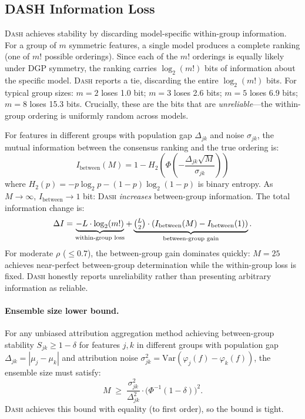 \documentclass{jmlr}
\newcommand{\Var}{\mathrm{Var}}
\newcommand{\DASH}{\textsc{Dash}}
\begin{document}
\subsection{DASH Information Loss}
\label{sec:info-loss}

\DASH{} achieves stability by discarding model-specific within-group information. For a group of $m$ symmetric features, a single model produces a complete ranking (one of $m!$ possible orderings). Since each of the $m!$ orderings is equally likely under DGP symmetry, the ranking carries $\log_2(m!)$ bits of information about the specific model. \DASH{} reports a tie, discarding the entire $\log_2(m!)$ bits. For typical group sizes: $m=2$ loses 1.0 bit; $m=3$ loses 2.6 bits; $m=5$ loses 6.9 bits; $m=8$ loses 15.3 bits. Crucially, these are the bits that are \emph{unreliable}---the within-group ordering is uniformly random across models.

For features in different groups with population gap $\Delta_{jk}$ and noise $\sigma_{jk}$, the mutual information between the consensus ranking and the true ordering is:
\[
    I_{\text{between}}(M) = 1 - H_2\!\left(\Phi\!\left(-\frac{\Delta_{jk}\sqrt{M}}{\sigma_{jk}}\right)\right)
\]
where $H_2(p) = -p\log_2 p - (1-p)\log_2(1-p)$ is binary entropy. As $M \to \infty$, $I_{\text{between}} \to 1$ bit: \DASH{} \emph{increases} between-group information. The total information change is:
\[
    \Delta I = \underbrace{-L \cdot \log_2(m!)}_{\text{within-group loss}} + \underbrace{\tbinom{L}{2} \cdot (I_{\text{between}}(M) - I_{\text{between}}(1))}_{\text{between-group gain}}.
\]
For moderate $\rho$ ($\leq 0.7$), the between-group gain dominates quickly: $M = 25$ achieves near-perfect between-group determination while the within-group loss is fixed. \DASH{} honestly reports unreliability rather than presenting arbitrary information as reliable.

\paragraph{Ensemble size lower bound.}
\begin{proposition}
\label{prop:ensemble-lower-bound}
For any unbiased attribution aggregation method achieving between-group stability $S_{jk} \geq 1 - \delta$ for features $j, k$ in different groups with population gap $\Delta_{jk} = |\mu_j - \mu_k|$ and attribution noise $\sigma_{jk}^2 = \Var(\varphi_j(f) - \varphi_k(f))$, the ensemble size must satisfy:
\[
    M \;\geq\; \frac{\sigma_{jk}^2}{\Delta_{jk}^2} \cdot \bigl(\Phi^{-1}(1-\delta)\bigr)^2.
\]
\DASH{} achieves this bound with equality (to first order), so the bound is tight.
\end{proposition}
\end{document}
